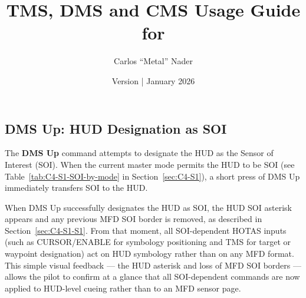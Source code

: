 \documentclass[11pt,a4paper]{article}
\title{TMS, DMS and CMS Usage Guide for \bmsver}
\author{Carlos ``Metal'' Nader}
\date{Version \fulldocversion{} | January 2026}
\begin{document}
\maketitle
\newpage
\tableofcontents
\newpage



\subsection{DMS Up: HUD Designation as SOI}
\label{sec:C4-S2}


The \textbf{DMS Up} command attempts to designate the HUD as the Sensor of Interest (SOI). When the current master mode permits the HUD to be SOI (see Table~\ref{tab:C4-S1-SOI-by-mode} in Section~\ref{sec:C4-S1}), a short press of DMS Up immediately transfers SOI to the HUD.

When DMS Up successfully designates the HUD as SOI, the HUD SOI asterisk appears and any previous MFD SOI border is removed, as described in Section~\ref{sec:C4-S1-S1}. From that moment, all SOI-dependent HOTAS inputs (such as CURSOR/ENABLE for symbology positioning and TMS for target or waypoint designation) act on HUD symbology rather than on any MFD format. This simple visual feedback --- the HUD asterisk and loss of MFD SOI borders --- allows the pilot to confirm at a glance that all SOI-dependent commands are now applied to HUD-level cueing rather than to an MFD sensor page.
\end{document}
